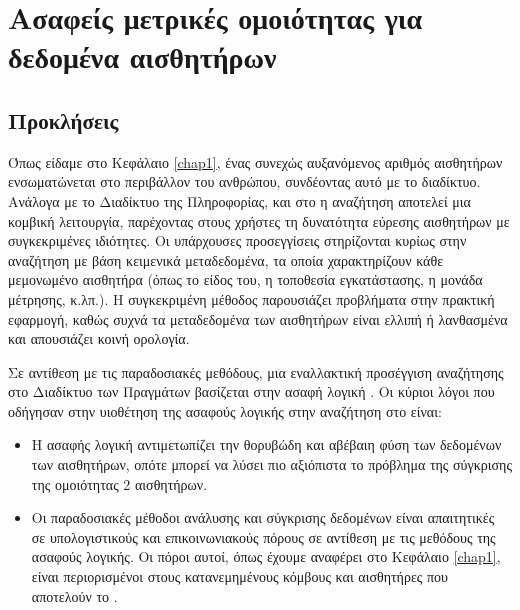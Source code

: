 \chapter{Ασαφείς μετρικές ομοιότητας για δεδομένα αισθητήρων}
\label{chap4}
\section{Προκλήσεις}
Όπως είδαμε στο Κεφάλαιο \ref{chap1}, ένας συνεχώς αυξανόμενος αριθμός αισθητήρων ενσωματώνεται στο περιβάλλον του ανθρώπου, συνδέοντας αυτό με το διαδίκτυο.
Ανάλογα με το Διαδίκτυο της Πληροφορίας, και στο  η αναζήτηση αποτελεί μια κομβική λειτουργία, παρέχοντας στους χρήστες τη δυνατότητα εύρεσης αισθητήρων με συγκεκριμένες ιδιότητες.
Οι υπάρχουσες προσεγγίσεις \cite{Nath2007} στηρίζονται κυρίως στην αναζήτηση με βάση κειμενικά μεταδεδομένα, τα οποία χαρακτηρίζουν κάθε μεμονωμένο αισθητήρα (όπως το είδος του, η τοποθεσία εγκατάστασης, η μονάδα μέτρησης, κ.λπ.).
Η συγκεκριμένη μέθοδος παρουσιάζει προβλήματα στην πρακτική εφαρμογή, καθώς συχνά τα μεταδεδομένα των αισθητήρων είναι ελλιπή ή λανθασμένα και απουσιάζει κοινή ορολογία.
\par
Σε αντίθεση με τις παραδοσιακές μεθόδους, μια εναλλακτική προσέγγιση αναζήτησης στο Διαδίκτυο των Πραγμάτων βασίζεται στην ασαφή λογική \cite{Truong2012}. 
Οι κύριοι λόγοι που οδήγησαν στην υιοθέτηση της ασαφούς λογικής στην αναζήτηση στο  είναι:
\begin{itemize}
    \item Η ασαφής λογική αντιμετωπίζει την θορυβώδη και αβέβαιη φύση των δεδομένων των αισθητήρων, οπότε μπορεί να λύσει πιο αξιόπιστα το πρόβλημα της σύγκρισης της ομοιότητας 2 αισθητήρων.
    \item Οι παραδοσιακές μέθοδοι ανάλυσης και σύγκρισης δεδομένων είναι απαιτητικές σε υπολογιστικούς και επικοινωνιακούς πόρους σε αντίθεση με τις μεθόδους της ασαφούς λογικής. Οι πόροι αυτοί, όπως έχουμε αναφέρει στο Κεφάλαιο \ref{chap1}, είναι περιορισμένοι στους κατανεμημένους κόμβους και αισθητήρες που αποτελούν το .
\end{itemize}
